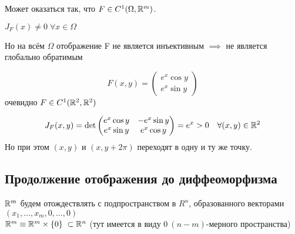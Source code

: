 \begin{note}
    Может оказаться так, что $F\in C^1(\Omega, \mathbb{R}^m)$.

    $J_F(x) \neq 0 \; \forall x \in \Omega$

    Но на всём $\Omega$ отображение F не является инъективным $\implies$ не является глобально обратимым

    \begin{example}
        \[
        F(x, y) =
        \begin{pmatrix}
            e^x \cos y \\
            e^x \sin y
        \end{pmatrix}
        \]
        очевидно $F \in C^1(\mathbb{R}^2, \mathbb{R}^2)$

        \[
        J_F(x, y) = \det
        \begin{pmatrix}
            e^x \cos y & -e^x \sin y \\
            e^x \sin y & e^x \cos y
        \end{pmatrix}
        = e^x > 0 \quad \forall (x, y) \in \mathbb{R}^2
        \]
        Но при этом $(x, y) \text{ и } (x, y + 2\pi)$ переходят в одну и ту же точку.
    \end{example}
\end{note}

\subsection{Продолжение отображения до диффеоморфизма}
\newcommand{\Fover}{\overline{F}}
$\mathbb{R}^m$ будем отождествлять с подпространством в $R^n$, образованного векторами \\ 
$(x_1, \hdots, x_m, 0, \hdots, 0)$ \\
$\mathbb{R}^m \equiv \mathbb{R}^m \times \{0\} \; \subset \mathbb{R}^n$ \quad \quad (тут имеется в виду $0\ (n - m)$-мерного пространства)

